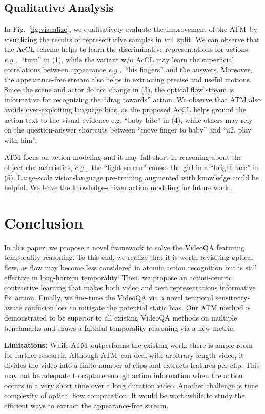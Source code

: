 \documentclass[sigconf]{acmart}
\newcommand{\methodname}{ATM~}
\newcommand{\eg}{\emph{e.g.,~}}
\begin{document}
\subsection{Qualitative Analysis}

In Fig.~\ref{fig:visualize}, we qualitatively evaluate the improvement of the \methodname by visualizing the results of representative samples in val. split. We can observe that the AcCL scheme helps to learn the discriminative representations for actions \eg ``turn'' in (1), while the variant w/o AcCL may learn the superficial correlations between appearance \eg ``his fingers'' and the answers. Moreover, the appearance-free stream also helps in extracting precise and useful motions. Since the scene and actor do not change in (3), the optical flow stream is informative for recognizing the ``drag towards'' action. We observe that ATM also avoids over-exploiting language bias, as the proposed AcCL helps ground the action text to the visual evidence e.g. ``baby bite'' in (4), while others may rely on the question-answer shortcuts between ``move finger to baby'' and ``a2. play with him''.

ATM focus on action modeling and it may fall short in reasoning about the object characteristics, \eg the ``light screen'' causes the girl in a ``bright face'' in (5).
Large-scale vision-language pre-training augmented with knowledge could be helpful. We leave the knowledge-driven action modeling for future work.
 \section{Conclusion}

In this paper, we propose a novel framework to solve the VideoQA featuring temporality reasoning.
To this end, we realize that it is worth revisiting optical flow, as flow may become less considered in atomic action recognition but is still effective in long-horizon temporality. Then, we propose an action-centric contrastive learning that makes both video and text representations informative for action.
Finally, we fine-tune the VideoQA via a novel temporal sensitivity-aware confusion loss to mitigate the potential static bias.
Our ATM method is demonstrated to be superior to all existing VideoQA methods on multiple benchmarks and shows a faithful temporality reasoning via a new metric. 

\textbf{Limitations:}
While \methodname outperforms the existing work, there is ample room for further research. 
Although \methodname can deal with arbitrary-length video, it divides the video into a finite number of clips and extracts features per clip. This may not be adequate to capture enough action information when the action occurs in a very short time over a long duration video. 
Another challenge is time complexity of optical flow computation. It would be worthwhile to study the efficient ways to extract the appearance-free stream.  
~\\[0pt]
\end{document}
